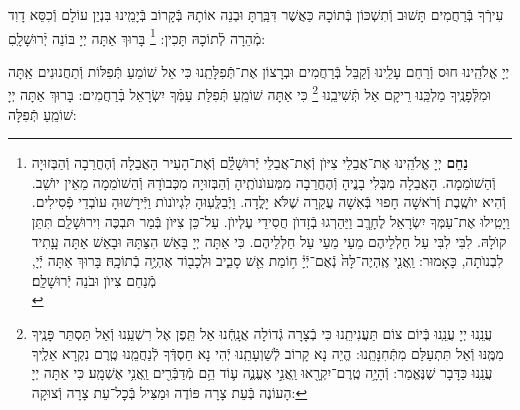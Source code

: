 \documentclass[twoside, openany, parskip=half, 11pt]{book}
\begin{document}
עִירְֿךָ בְּֿרַחֲמִים תָּשׁוּב וְֿתִשְׁכּוֹן בְּֿתוֹכָהּ כַּאֲשֶׁר דִּבַּֽרְתָּ וּבְנֵה אוֹתָהּ בְּֿקָרוֹב בְּֿיָמֵֽינוּ בִּנְיַן עוֹלָם וְֿכִסֵּא דָוִד מְֿהֵרָה לְֿתוֹכָהּ תָּכִין:
\footnote{
\textbf{נַחֵם}
יְיָ אֱלֹהֵֽינוּ אֶת־אֲבֵלֵי צִיּוֺן וְֿאֶת־אֲבֵלֵי יְֿרוּשָׁלַֽ֔֗͏ִם וְֿאֶת־הָעִיר הָאֲבֵלָה וְֿהֶחֳרֵבָה וְֿהַבְּזוּיָה וְֿהַשׁוֺמֵמָה. הָאֲבֵלָה מִבְּלִי בָנֱיהָ וְֿהֶחֳרֵבָה מִמְּעוֺנוֺתֶֽיהָ וְֿהַבְּזוּיָה מִכְּבוֺדָהּ וְֿהַשׁוֺמֵמָה מֵאֵין יוֺשֵׁב. וְֿהִיא יוֺשֶֽׁבֶת וְֿרֹאשָׁה חָפוּי בְּֿאִשָׁה עֲקַרָה שֶׁלֹּא יָלֳדָה. וַיְֿבַלְְּעֽוּהָ לִגְיוֺנוֺת וַיְּֿירָשׁוּהָ עוֺבְדֵי פְֿסִילִים. וַיָטִֽילוּ אֶת־עַמְּךָ יִשְׂרָאֵל לֶחָרֱֽב וַיַּהַרְגוּ בְֿזָדוֺן חֲסִידֵי עֶלְיוֺן. עַל־כֵּן צִיּוֺן בְּֿמַר תּבְכֶּה וִירוּשָׁלַֽ͏ִם תִּתֵּן קוֺלָהּ. לִבִּי לִבִּי עַל חַלְלֵיהֶם מֵעַי מֵעַי עַל חַלְלֵיהֶם. כִּי אַתָּה יְיָ בָּאֵשׁ הִצַּתָּהּ וּבָאֵשׁ אַתָּה עָָתִיד לִבְנוֺתָה, כָּאָמוּר: וַֽאֲנִ֤י אֶֽהְיֶה־לָּהּ֙ נְֿאֻם־יְֿיָ֔ ח֥וֹמַת אֵ֖שׁ סָבִ֑יב וּלְכָב֖וֹד אֶהְיֶ֥ה בְֿתוֹכָֽהּ׃
בָּרוּךְ אַתָּה יְֿיָ, מְֿנַחֵם צִיוֺן וּבֹנֵה יְֿרוּשָׁלַֽ͏ִם׃ \\
}
בָּרוּךְ אַתָּה יְיָ בּוֹנֵה יְֿרוּשָׁלָֽםִ:

\weekdaysamalchus

יְיָ אֱלֹהֵֽינוּ חוּס וְֿרַחֵם עָלֵֽינוּ וְֿקַבֵּל בְּֿרַחֲמִים וּבְרָצוֹן אֶת־תְּֿפִלָּתֵֽנוּ כִּי אֵל שׁוֹמֵעַ תְּֿפִלּוֹת וְֿתַחֲנוּנִים אַֽתָּה וּמִלְּֿפָנֶֽיךָ מַלְכֵּֽנוּ רֵיקָם אַל תְּֿשִׁיבֵֽנוּ
\footnote{
עֲנֵֽנוּ יְיָ עֲנֵֽנוּ בְּֿיוֹם צוֹם תַּעֲנִיתֵֽנוּ כִּי בְֿצָרָה גְֿדוֹלָה אֲנָֽחְֿנוּ אַל תֵּֽפֶן אֶל רִשְׁעֵֽנוּ וְֿאַל תַּסְתֵּר פָּנֶֽיךָ מִמֶּֽנּוּ וְֿאַל תִּתְעַלַּם מִתְּֿחִנָּתֵֽנוּ: הֱיֵה נָא קָרוֹב לְֿשַׁוְעָתֵֽנוּ יְֿהִי נָא חַסְדְּֿךָ לְֿנַחֲמֵֽנוּ טֶֽרֶם נִקְרָא אֵלֶֽיךָ עֲנֵֽנוּ כַּדָּבָר שֶׁנֶּאֱמַר:
וְֿהָיָ֥ה טֶֽרֶם־יִקְרָ֖אוּ וַֽאֲנִ֣י אֶעֱנֶ֑ה ע֛וֹד הֵ֥ם מְֿדַבְּֿרִ֖ים וַֽאֲנִ֥י אֶשְׁמָֽע׃ כִּי אַתָּה יְיָ הָעוֹנֶה בְּֿעֵת צָרָה פּוֹדֶה וּמַצִּיל בְּֿכׇל־עֵת צָרָה וְֿצוּקָה:
}
כִּי אַתָּה שׁוֹמֵֽעַ תְּֿפִלַּת עַמְּֿךָ יִשְׂרָאֵל בְּֿרַחֲמִים: בָּרוּךְ אַתָּה יְיָ שׁוֹמֵֽעַ תְּֿפִלָּה:

\retzeh

\yaalehveyavo

\zion

\modim

\clearpage

\alhanisim

\weekdaysahodos
\end{document}
